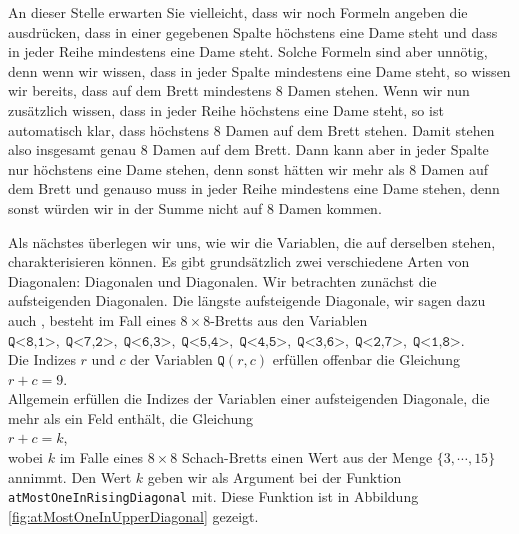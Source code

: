 An dieser Stelle erwarten Sie vielleicht, dass wir noch Formeln angeben die
ausdrücken, dass in einer gegebenen Spalte höchstens eine Dame steht und dass in jeder
Reihe mindestens eine Dame steht.
Solche Formeln sind aber unnötig, denn wenn wir wissen, dass in jeder Spalte mindestens
eine Dame steht, so wissen wir bereits, dass auf dem Brett mindestens 8 Damen stehen.
Wenn wir nun zusätzlich wissen, dass in jeder Reihe höchstens eine Dame steht, so ist
automatisch klar, dass höchstens 8 Damen auf dem Brett stehen.  Damit stehen also insgesamt genau
8 Damen auf dem Brett.  Dann kann aber in jeder Spalte nur höchstens eine Dame stehen, denn sonst hätten wir
mehr als 8 Damen auf dem Brett und genauso muss in jeder Reihe mindestens eine Dame stehen, denn sonst würden
wir in der Summe nicht auf 8 Damen kommen. 

Als nächstes überlegen wir uns, wie wir die Variablen, die auf derselben 
stehen, charakterisieren können.  Es gibt grundsätzlich zwei verschiedene Arten von
Diagonalen:  Diagonalen und  Diagonalen.  Wir be\-trach\-ten zunächst
die aufsteigenden Diagonalen.  Die längste aufsteigende Diagonale, wir sagen dazu auch
, besteht im Fall eines $8 \times 8$-Bretts aus den
Variablen \\[0.2cm]
\hspace*{1.3cm} 
$\texttt{Q<8,1>},\; \texttt{Q<7,2>},\; \texttt{Q<6,3>},\; \texttt{Q<5,4>},\; \texttt{Q<4,5>},\; \texttt{Q<3,6>},\; 
 \texttt{Q<2,7>},\; \texttt{Q<1,8>}$. 
\\[0.2cm]
Die Indizes $r$ und $c$ der Variablen $\texttt{Q}(r,c)$ erfüllen offenbar
die Gleichung \\[0.2cm]
\hspace*{1.3cm} $r + c = 9$. \\[0.2cm]
Allgemein erfüllen die Indizes der Variablen einer aufsteigenden Diagonale, die mehr als ein Feld enthält, die
Gleichung \\[0.2cm] 
\hspace*{1.3cm} $r + c = k$, \\[0.2cm]
wobei $k$ im Falle eines $8 \times 8$ Schach-Bretts einen Wert aus der Menge $\{3, \cdots, 15 \}$ annimmt.  Den Wert $k$ geben wir als Argument bei der
Funktion \texttt{atMostOneInRisingDiagonal} mit.  Diese Funktion ist in Abbildung
\ref{fig:atMostOneInUpperDiagonal} gezeigt. 

